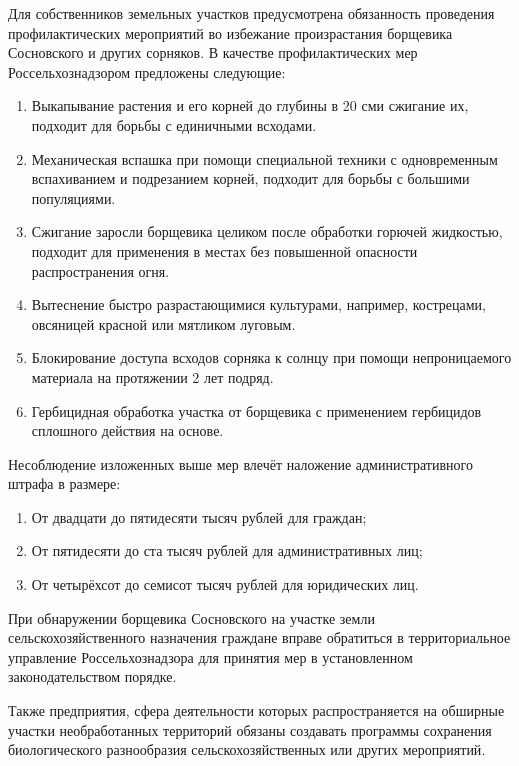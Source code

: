 \nwln
Для собственников земельных участков предусмотрена обязанность проведения профилактических мероприятий во избежание произрастания борщевика Сосновского и других сорняков\cite{rural-measures}.
В качестве профилактических мер Россельхознадзором\cite{countryside-measures} предложены следующие:
\begin{enumerate}[topsep=0pt, parsep=0pt, itemsep=0pt, wide=0.5cm]
	\item Выкапывание растения и его корней до глубины в 20 сми сжигание их, подходит для борьбы с единичными всходами.
	\item Механическая вспашка при помощи специальной техники с одновременным вспахиванием и подрезанием корней, подходит для борьбы с большими популяциями.
	\item Сжигание заросли борщевика целиком после обработки горючей жидкостью, подходит для применения в местах без повышенной опасности распространения огня.
	\item Вытеснение быстро разрастающимися культурами, например, кострецами, овсяницей красной или мятликом луговым.
	\item Блокирование доступа всходов сорняка к солнцу при помощи непроницаемого материала на протяжении 2 лет подряд.
	\item Гербицидная обработка участка от борщевика с применением гербицидов сплошного действия на основе.
\end{enumerate}

\nwln
Несоблюдение изложенных выше мер влечёт наложение административного штрафа в размере:
\begin{enumerate}[topsep=0pt, parsep=0pt, itemsep=0pt, wide=0.5cm]
	\item От двадцати до пятидесяти тысяч рублей для граждан;
	\item От пятидесяти до ста тысяч рублей для административных лиц;
	\item От четырёхсот до семисот тысяч рублей для юридических лиц.
\end{enumerate}

\nwln
При обнаружении борщевика Сосновского на участке земли сельскохозяйственного назначения\cite{rural-law} граждане вправе обратиться в территориальное управление Россельхознадзора для принятия мер в установленном законодательством порядке.

\nwln
Также предприятия, сфера деятельности которых распространяется на обширные участки необработанных территорий\cite{govern-law} обязаны создавать программы сохранения биологического разнообразия сельскохозяйственных или других мероприятий\cite{nature-law}.

